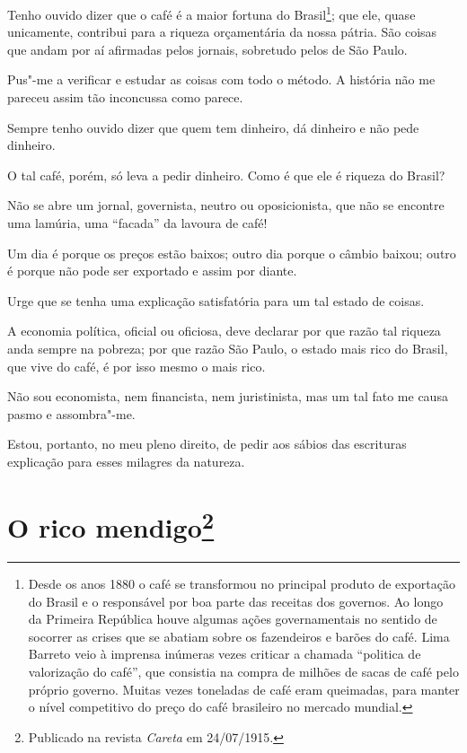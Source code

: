 Tenho ouvido dizer que o café é a maior fortuna do Brasil\footnote{Desde
  os anos 1880 o café se transformou no principal produto de exportação
  do Brasil e o responsável por boa parte das receitas dos governos. Ao
  longo da Primeira República houve algumas ações governamentais no
  sentido de socorrer as crises que se abatiam sobre os fazendeiros e
  barões do café. Lima Barreto veio à imprensa inúmeras vezes criticar a
  chamada ``politica de valorização do café'', que consistia na compra
  de milhões de sacas de café pelo próprio governo. Muitas vezes
  toneladas de café eram queimadas, para manter o nível competitivo do
  preço do café brasileiro no mercado mundial.}; que ele, quase
unicamente, contribui para a riqueza orçamentária da nossa pátria. São
coisas que andam por aí afirmadas pelos jornais, sobretudo pelos de São
Paulo.

Pus"-me a verificar e estudar as coisas com todo o método. A história não
me pareceu assim tão inconcussa como parece.

Sempre tenho ouvido dizer que quem tem dinheiro, dá dinheiro e não pede
dinheiro.

O tal café, porém, só leva a pedir dinheiro. Como é que ele é riqueza do
Brasil?

Não se abre um jornal, governista, neutro ou oposicionista, que não se
encontre uma lamúria, uma ``facada'' da lavoura de café!

Um dia é porque os preços estão baixos; outro dia porque o câmbio
baixou; outro é porque não pode ser exportado e assim por diante.

Urge que se tenha uma explicação satisfatória para um tal estado de
coisas.

A economia política, oficial ou oficiosa, deve declarar por que razão
tal riqueza anda sempre na pobreza; por que razão São Paulo, o estado
mais rico do Brasil, que vive do café, é por isso mesmo o mais rico.

Não sou economista, nem financista, nem juristinista, mas um tal fato me
causa pasmo e assombra"-me.

Estou, portanto, no meu pleno direito, de pedir aos sábios das
escrituras explicação para esses milagres da natureza.



\chapter[O rico mendigo]{O rico mendigo\footnote[*]{Publicado na revista \emph{Careta} em 24/07/1915.}}

